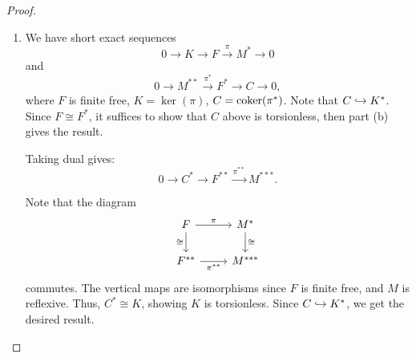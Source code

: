 \documentclass[12pt]{article}
\begin{document}
\begin{proof}
\begin{enumerate}[label=(\alph*)]
		 Any finite free module $F$ is torsionless.
		\begin{proof} 
			Let $\{e_{i}\}_{i}$ be a basis for $F$. Then, there exists a dual basis $\{e_{i}^{\ast}\}_{i}$ for $F^{\ast}$. Now, given $x \in F \setminus \{0\}$, we can write $x = \sum a_{i} e_{i}$ with some $a_{i}$ nonzero. Then,
			\begin{equation*} 
				e_{i}^{\ast}(x) = a_{i} \neq 0. \qedhere
			\end{equation*}
		\end{proof}
		These two claims give the result.
		\item We have short exact sequences 
		\begin{equation*} 
			0 \to K \to F \xrightarrow{\pi} M^{\ast} \to 0
		\end{equation*}
		and
		\begin{equation*} 
			0 \to M^{\ast \ast} \xrightarrow{\pi^{\ast}} F^{\ast} \to C \to 0,
		\end{equation*}
		where $F$ is finite free, $K = \ker(\pi)$, $C = \operatorname{coker}(\pi^{\ast})$. Note that $C \hookrightarrow K^{\ast}$. Since $F \cong F^{\ast}$, it suffices to show that $C$ above is torsionless, then part (b) gives the result.

		Taking dual gives:
		\begin{equation*} 
			0 \to C^{\ast} \to F^{\ast \ast} \xrightarrow{\pi^{\ast \ast}} M^{\ast \ast \ast}.
		\end{equation*}

		Note that the diagram
		\begin{equation*} 
			\begin{tikzcd}
				F \arrow[r, "\pi"] \arrow[d, "\cong"'] & M^{\ast} \arrow[d, "\cong"] \\
				F^{\ast \ast} \arrow[r, "\pi^{\ast \ast}"'] & M^{\ast \ast \ast}
			\end{tikzcd}
		\end{equation*}
		commutes. The vertical maps are isomorphisms since $F$ is finite free, and $M$ is reflexive. Thus, $C^{\ast} \cong K$, showing $K$ is torsionless. Since $C \hookrightarrow K^{\ast}$, we get the desired result.
	\end{enumerate}
\end{proof}



\newpage

\end{document}
